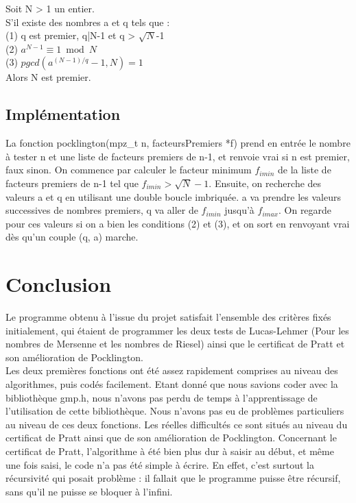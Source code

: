 \documentclass[a4paper]{article}
\begin{document}
\begin{theorem}
Soit N > 1 un entier.\\
S'il existe des nombres a et q tels que :\\
(1) q est premier, q|N-1 et q > $\sqrt{N}$-1\\
(2) $a^{N-1} \equiv 1 \bmod{N}$\\
(3) $pgcd(a^{(N-1)/q}-1, N) = 1$\\
Alors N est premier.
\end{theorem}

\subsection{Implémentation}

La fonction pocklington(mpz\_t n, facteursPremiers *f) prend en entrée le
nombre à tester n et une liste de facteurs premiers de n-1, et renvoie vrai
si n est premier, faux sinon. On commence par calculer le facteur minimum $f_{imin}$ de
la liste de facteurs premiers de n-1 tel que $f_{imin} > \sqrt{N}-1$. Ensuite, on
recherche des valeurs a et q en utilisant une double boucle imbriquée. a va
prendre les valeurs successives de nombres premiers, q va aller de $f_{imin}$
jusqu'à $f_{imax}$. On regarde pour ces valeurs si on a bien les conditions (2) et (3),
et on sort en renvoyant vrai dès qu'un couple (q, a) marche.


\newpage

\section*{Conclusion}

Le programme obtenu à l'issue du projet satisfait l'ensemble des critères
fixés initialement, qui étaient de programmer les deux tests de Lucas-Lehmer
(Pour les nombres de Mersenne et les nombres de Riesel) ainsi que le certificat
de Pratt et son amélioration de Pocklington.\\

Les deux premières fonctions ont été assez rapidement comprises au niveau
des algorithmes, puis codés facilement. Etant donné que nous savions coder
avec la bibliothèque gmp.h, nous n'avons pas perdu de temps à l'apprentissage
de l'utilisation de cette bibliothèque. Nous n'avons pas eu de problèmes
particuliers au niveau de ces deux fonctions. Les réelles difficultés ce
sont situés au niveau du certificat de Pratt ainsi que de son amélioration
de Pocklington. Concernant le certificat de Pratt, l'algorithme à été bien
plus dur à saisir au début, et même une fois saisi, le code n'a pas été simple
à écrire. En effet, c'est surtout la récursivité qui posait problème : il
fallait que le programme puisse être récursif, sans qu'il ne puisse se bloquer
à l'infini.
\end{document}
